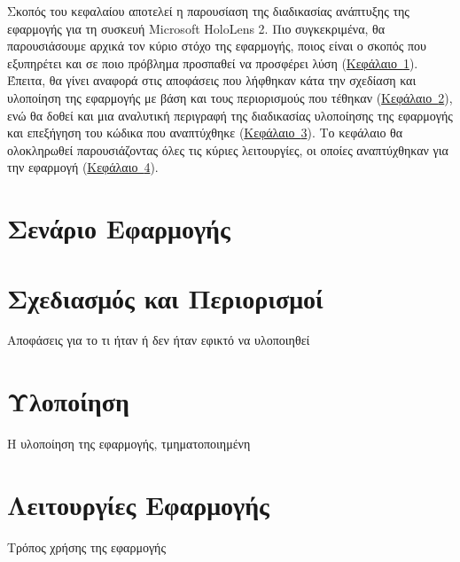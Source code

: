 
Σκοπός του κεφαλαίου αποτελεί η παρουσίαση της διαδικασίας ανάπτυξης της εφαρμογής για τη συσκευή Microsoft HoloLens 2. Πιο συγκεκριμένα, θα παρουσιάσουμε αρχικά τον κύριο στόχο της εφαρμογής, ποιος είναι ο σκοπός που εξυπηρέτει και σε ποιο πρόβλημα προσπαθεί να προσφέρει λύση (\hyperref[sec:appScenario]{Κεφάλαιο~\ref*{sec:appScenario}}). Έπειτα, θα γίνει αναφορά στις αποφάσεις που λήφθηκαν κάτα την σχεδίαση και υλοποίηση της εφαρμογής με βάση και τους περιορισμούς που τέθηκαν (\hyperref[sec:appDesignAndLimitations]{Κεφάλαιο~\ref*{sec:appDesignAndLimitations}}), ενώ θα δοθεί και μια αναλυτική περιγραφή της διαδικασίας υλοποίησης της εφαρμογής και επεξήγηση του κώδικα που αναπτύχθηκε (\hyperref[sec:appImplementation]{Κεφάλαιο~\ref*{sec:appImplementation}}). Το κεφάλαιο θα ολοκληρωθεί παρουσιάζοντας όλες τις κύριες λειτουργίες, οι οποίες αναπτύχθηκαν για την εφαρμογή (\hyperref[sec:appFunctionalities]{Κεφάλαιο~\ref*{sec:appFunctionalities}}).

\section{Σενάριο Εφαρμογής}\label{sec:appScenario}


\section{Σχεδιασμός και Περιορισμοί}\label{sec:appDesignAndLimitations}
Αποφάσεις για το τι ήταν ή δεν ήταν εφικτό να υλοποιηθεί

\section{Υλοποίηση}\label{sec:appImplementation}
Η υλοποίηση της εφαρμογής, τμηματοποιημένη

\section{Λειτουργίες Εφαρμογής}\label{sec:appFunctionalities}
Τρόπος χρήσης της εφαρμογής

